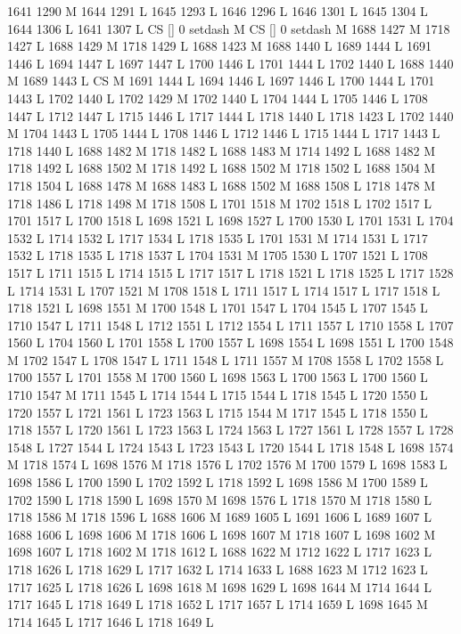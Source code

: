 {{{{{{{{{{{{{{{{{{{{{{{{1641 1290 M 1644 1291 L
1645 1293 L
1646 1296 L
1646 1301 L
1645 1304 L
1644 1306 L
1641 1307 L
CS [] 0 setdash M
CS [] 0 setdash M
1688 1427 M 1718 1427 L
1688 1429 M 1718 1429 L
1688 1423 M 1688 1440 L
1689 1444 L
1691 1446 L
1694 1447 L
1697 1447 L
1700 1446 L
1701 1444 L
1702 1440 L
1688 1440 M 1689 1443 L
CS M
1691 1444 L
1694 1446 L
1697 1446 L
1700 1444 L
1701 1443 L
1702 1440 L
1702 1429 M 1702 1440 L
1704 1444 L
1705 1446 L
1708 1447 L
1712 1447 L
1715 1446 L
1717 1444 L
1718 1440 L
1718 1423 L
1702 1440 M 1704 1443 L
1705 1444 L
1708 1446 L
1712 1446 L
1715 1444 L
1717 1443 L
1718 1440 L
1688 1482 M 1718 1482 L
1688 1483 M 1714 1492 L
1688 1482 M 1718 1492 L
1688 1502 M 1718 1492 L
1688 1502 M 1718 1502 L
1688 1504 M 1718 1504 L
1688 1478 M 1688 1483 L
1688 1502 M 1688 1508 L
1718 1478 M 1718 1486 L
1718 1498 M 1718 1508 L
1701 1518 M 1702 1518 L
1702 1517 L
1701 1517 L
1700 1518 L
1698 1521 L
1698 1527 L
1700 1530 L
1701 1531 L
1704 1532 L
1714 1532 L
1717 1534 L
1718 1535 L
1701 1531 M 1714 1531 L
1717 1532 L
1718 1535 L
1718 1537 L
1704 1531 M 1705 1530 L
1707 1521 L
1708 1517 L
1711 1515 L
1714 1515 L
1717 1517 L
1718 1521 L
1718 1525 L
1717 1528 L
1714 1531 L
1707 1521 M 1708 1518 L
1711 1517 L
1714 1517 L
1717 1518 L
1718 1521 L
1698 1551 M 1700 1548 L
1701 1547 L
1704 1545 L
1707 1545 L
1710 1547 L
1711 1548 L
1712 1551 L
1712 1554 L
1711 1557 L
1710 1558 L
1707 1560 L
1704 1560 L
1701 1558 L
1700 1557 L
1698 1554 L
1698 1551 L
1700 1548 M 1702 1547 L
1708 1547 L
1711 1548 L
1711 1557 M 1708 1558 L
1702 1558 L
1700 1557 L
1701 1558 M 1700 1560 L
1698 1563 L
1700 1563 L
1700 1560 L
1710 1547 M 1711 1545 L
1714 1544 L
1715 1544 L
1718 1545 L
1720 1550 L
1720 1557 L
1721 1561 L
1723 1563 L
1715 1544 M 1717 1545 L
1718 1550 L
1718 1557 L
1720 1561 L
1723 1563 L
1724 1563 L
1727 1561 L
1728 1557 L
1728 1548 L
1727 1544 L
1724 1543 L
1723 1543 L
1720 1544 L
1718 1548 L
1698 1574 M 1718 1574 L
1698 1576 M 1718 1576 L
1702 1576 M 1700 1579 L
1698 1583 L
1698 1586 L
1700 1590 L
1702 1592 L
1718 1592 L
1698 1586 M 1700 1589 L
1702 1590 L
1718 1590 L
1698 1570 M 1698 1576 L
1718 1570 M 1718 1580 L
1718 1586 M 1718 1596 L
1688 1606 M 1689 1605 L
1691 1606 L
1689 1607 L
1688 1606 L
1698 1606 M 1718 1606 L
1698 1607 M 1718 1607 L
1698 1602 M 1698 1607 L
1718 1602 M 1718 1612 L
1688 1622 M 1712 1622 L
1717 1623 L
1718 1626 L
1718 1629 L
1717 1632 L
1714 1633 L
1688 1623 M 1712 1623 L
1717 1625 L
1718 1626 L
1698 1618 M 1698 1629 L
1698 1644 M 1714 1644 L
1717 1645 L
1718 1649 L
1718 1652 L
1717 1657 L
1714 1659 L
1698 1645 M 1714 1645 L
1717 1646 L
1718 1649 L
}}}}}}}}}}}}}}}}}}}}}}}}
